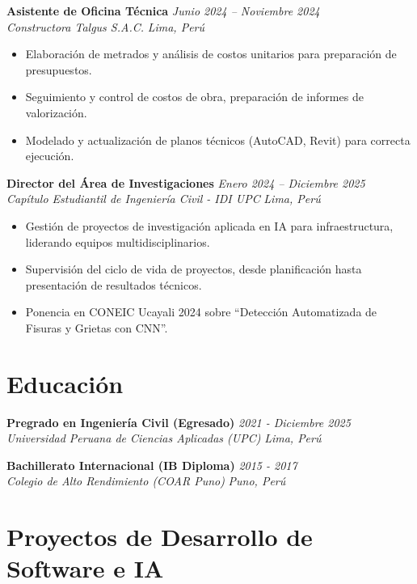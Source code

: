 \documentclass[10pt, a4paper]{article}
\newcommand{\entry}[4]{
    \textbf{#1} \hfill \textit{#2} \\
    \textit{#3} \hfill \textit{#4} \\
    \vspace{-1.5mm} 
}
\begin{document}
\vspace{1mm} 

\entry{Asistente de Oficina Técnica}{Junio 2024 – Noviembre 2024}{Constructora Talgus S.A.C.}{Lima, Perú}
\begin{itemize}
    \item Elaboración de metrados y análisis de costos unitarios para preparación de presupuestos.
    \item Seguimiento y control de costos de obra, preparación de informes de valorización.
    \item Modelado y actualización de planos técnicos (AutoCAD, Revit) para correcta ejecución.
\end{itemize}

\vspace{1mm} 

\entry{Director del Área de Investigaciones}{Enero 2024 – Diciembre 2025}{Capítulo Estudiantil de Ingeniería Civil - IDI UPC}{Lima, Perú}
\begin{itemize}
    \item Gestión de proyectos de investigación aplicada en IA para infraestructura, liderando equipos multidisciplinarios.
    \item Supervisión del ciclo de vida de proyectos, desde planificación hasta presentación de resultados técnicos.
    \item Ponencia en CONEIC Ucayali 2024 sobre ``Detección Automatizada de Fisuras y Grietas con CNN''.
\end{itemize}

\section*{Educación}
\entry{Pregrado en Ingeniería Civil (Egresado)}{2021 - Diciembre 2025}{Universidad Peruana de Ciencias Aplicadas (UPC)}{Lima, Perú}
\vspace{1mm}
\entry{Bachillerato Internacional (IB Diploma)}{2015 - 2017}{Colegio de Alto Rendimiento (COAR Puno)}{Puno, Perú}

\section*{Proyectos de Desarrollo de Software e IA}
\end{document}
